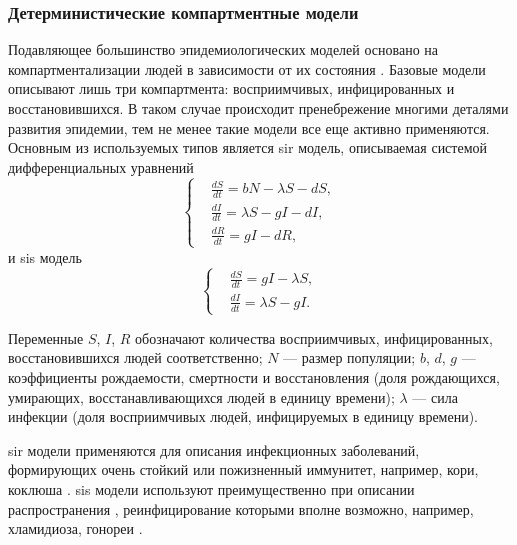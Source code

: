 \documentclass[a4paper,12pt]{article} %
\begin{document}
\subsubsection{Детерминистические компартментные модели}

Подавляющее большинство эпидемиологических моделей основано на компартментализации людей в зависимости от их состояния \cite{keeling2005networks,kermack1927contribution,bailey1957mathematical,anderson1992may}. Базовые модели описывают лишь три компартмента: восприимчивых, инфицированных и восстановившихся. В таком случае происходит пренебрежение многими деталями развития эпидемии, тем не менее такие модели все еще активно применяются. Основным из используемых типов является \gls{sir} модель, описываемая системой дифференциальных уравнений
\begin{equation}
    \left\{
    \begin{aligned}
    & \frac{dS}{dt}=bN-\lambda S-dS, \\
    & \frac{dI}{dt}=\lambda S-gI-dI, \\
    & \frac{dR}{dt}=gI-dR,
    \end{aligned}
    \right.
\end{equation}
и \gls{sis} модель
\begin{equation}
    \left\{
    \begin{aligned}
        & \frac{dS}{dt} = gI-\lambda S, \\
        & \frac{dI}{dt} = \lambda S - gI.
    \end{aligned}
    \right.
\end{equation}

Переменные $S$, $I$, $R$ обозначают количества восприимчивых, инфицированных, восстановившихся людей соответственно; $N$ --- размер популяции; $b$, $d$, $g$ --- коэффициенты рождаемости, смертности и восстановления (доля рождающихся, умирающих, восстанавливающихся людей в единицу времени); $\lambda$ --- сила инфекции (доля восприимчивых людей, инфицируемых в единицу времени).

\gls{sir} модели применяются для описания инфекционных заболеваний, формирующих очень стойкий или пожизненный иммунитет, например, кори, коклюша \cite{keeling2005networks,kermack1927contribution,anderson1992may,grenfell1992chance,rohani2000impact}. \gls{sis} модели используют преимущественно при описании распространения , реинфицирование которыми вполне возможно, например, хламидиоза, гонореи \cite{keeling2005networks,hethcote1984springer,garnett1996sexually}.
\end{document}
